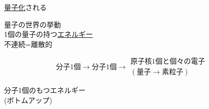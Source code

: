 \documentclass{../../../notebook}
\begin{document}
\underline{量子化}される\\
\hspace{1zw}{\it quantization}

\hspace{10zw}量子の世界の挙動\\
\hspace{11zw}1個の量子の持つ\underline{エネルギー}\\
\hspace{11zw}\phantom{1個の量子の持つ}不連続=離散的

\[
  \mathrm{分子1個} \longrightarrow \mathrm{分子1個} \longrightarrow
  \begin{array}{l}
    \mathrm{原子核1個と個々の電子}\\
    (\mathrm{量子} \to \mathrm{素粒子})
  \end{array}
\]

分子1個のもつエネルギー\\
\hspace{5zw}(ボトムアップ)
\end{document}
